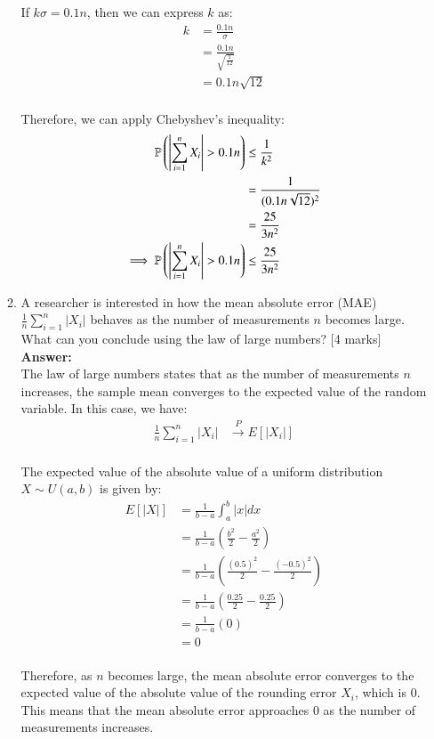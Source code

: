 \documentclass[12pt]{article}
\begin{document}
\begin{enumerate}
\begin{enumerate}
If $k\sigma = 0.1 n$, then we can express $k$ as:
\begin{align*}
k &= \frac{0.1 n}{\sigma} \\
&= \frac{0.1 n}{\sqrt{\frac{1}{12}}} \\
&= 0.1 n \sqrt{12} \\
\end{align*}

Therefore, we can apply Chebyshev's inequality:
\begin{align*}
{\mathbb P}\left(\left|\sum_{i=1}^n X_i\right| > 0.1 n\right) &\leq \frac{1}{k^2} \\
&= \frac{1}{(0.1 n \sqrt{12})^2} \\
&= \frac{25}{3 n^2} \\
\implies {\mathbb P}\left(\left|\sum_{i=1}^n X_i\right| > 0.1 n\right) &\leq \frac{25}{3 n^2} \\
\end{align*}
%

\item A researcher is interested in how the mean absolute error (MAE) $\frac{1}{n} \sum_{i=1}^n |X_i|$ behaves as the number of measurements $n$ becomes large. What can you conclude using the law of large numbers?
			\hfill [4 marks]
%
\\
\textbf{Answer:}
\\
The law of large numbers states that as the number of measurements $n$ increases, the sample mean converges to the expected value of the random variable. In this case, we have:
\begin{align*}
\frac{1}{n} \sum_{i=1}^n |X_i| &\xrightarrow{P} E[|X_i|] \\
\end{align*}

The expected value of the absolute value of a uniform distribution $X \sim U(a, b)$ is given by:
\begin{align*}
E[|X|] &= \frac{1}{b-a} \int_a^b |x| dx \\
&= \frac{1}{b-a} \left(\frac{b^2}{2} - \frac{a^2}{2}\right) \\
&= \frac{1}{b-a} \left(\frac{(0.5)^2}{2} - \frac{(-0.5)^2}{2}\right) \\
&= \frac{1}{b-a} \left(\frac{0.25}{2} - \frac{0.25}{2}\right) \\
&= \frac{1}{b-a} \left(0\right) \\
&= 0 \\
\end{align*}

Therefore, as $n$ becomes large, the mean absolute error converges to the expected value of the absolute value of the rounding error $X_i$, which is $0$. This means that the mean absolute error approaches $0$ as the number of measurements increases.
%


\end{enumerate}
\end{enumerate}
\end{document}
